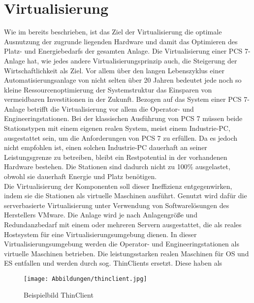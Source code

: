 \section{Virtualisierung}
Wie im  bereits beschrieben, ist das Ziel der Virtualisierung die optimale Ausnutzung der zugrunde liegenden Hardware und damit das Optimieren des Platz- und Energiebedarfs der gesamten Anlage. Die Virtualisierung einer PCS 7-Anlage hat, wie jedes andere Virtualisierungsprinzip auch, die Steigerung der Wirtschaftlichkeit als Ziel. Vor allem über den langen Lebenszyklus einer Automatisierungsanlage von nicht selten über 20 Jahren bedeutet jede noch so kleine Ressourcenoptimierung der Systemstruktur das Einsparen von vermeidbaren Investitionen in der Zukunft. Bezogen auf das System einer PCS 7-Anlage betrifft die Virtualisierung vor allem die Operator- und Engineeringstationen. Bei der klassischen Ausführung von PCS 7 müssen beide Stationstypen mit einem eigenen realen System, meist einem Industrie-PC, ausgestattet sein, um die Anforderungen von PCS 7 zu erfüllen. Da es jedoch nicht empfohlen ist, einen solchen Industrie-PC dauerhaft an seiner Leistungsgrenze zu betreiben, bleibt ein Restpotential in der vorhandenen Hardware bestehen. Die Stationen sind dadurch nicht zu 100\% ausgelastet, obwohl sie dauerhaft Energie und Platz benötigen.\medskip\\
Die Virtualisierung der Komponenten soll dieser Ineffizienz entgegenwirken, indem sie die Stationen als virtuelle Maschinen ausführt. Genutzt wird dafür die serverbasierte Virtualisierung unter Verwendung von Softwarelösungen des Herstellers VMware. Die Anlage wird je nach Anlagengröße und Redundanzbedarf mit einem oder mehreren Servern ausgestattet, die als reales Hostsystem für eine Virtualisierungsumgebung dienen. In dieser Virtualisierungsumgebung werden die Operator- und Engineeringstationen als virtuelle Maschinen betrieben. Die leistungsstarken realen Maschinen für OS und ES entfallen und werden durch sog. ThinClients ersetzt. Diese haben als 
\begin{wrapfigure}[11]{ht}[0cm]{5cm}
    \texttt{[image: Abbildungen/thinclient.jpg]}\caption[Beispielbild ThinClient]{Beispielbild ThinClient\protect\footnotemark}
    \label{fig:ThinClient}
    \centering
\end{wrapfigure}
